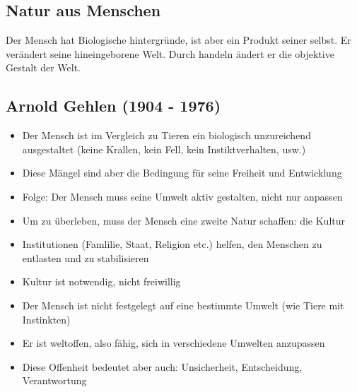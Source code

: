 \subsection{Natur aus Menschen}
Der Mensch hat Biologische hintergründe, ist aber ein Produkt seiner selbst. Er verändert seine hineingeborene Welt. Durch handeln ändert er die objektive Gestalt der Welt.

\subsection{Arnold Gehlen (1904 - 1976)}
\begin{itemize}
    \item Der Mensch ist im Vergleich zu Tieren ein biologisch unzureichend ausgestaltet (keine Krallen, kein Fell, kein Instiktverhalten, usw.)
    \item Diese Mängel sind aber die Bedingung für seine Freiheit und Entwicklung
    \item Folge: Der Mensch muss seine Umwelt aktiv gestalten, nicht nur anpassen
\end{itemize}

\begin{itemize}
    \item Um zu überleben, muss der Mensch eine zweite Natur schaffen: die Kultur
    \item Institutionen (Famlilie, Staat, Religion etc.) helfen, den Menschen zu entlasten und zu stabilisieren
    \item Kultur ist notwendig, nicht freiwillig
\end{itemize}

\begin{itemize}
    \item Der Mensch ist nicht festgelegt auf eine bestimmte Umwelt (wie Tiere mit Instinkten)
    \item Er ist weltoffen, also fähig, sich in verschiedene Umwelten anzupassen
    \item Diese Offenheit bedeutet aber auch: Unsicherheit, Entscheidung, Verantwortung
\end{itemize}
